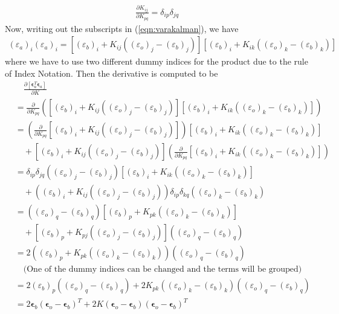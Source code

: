 \begin{align}
\frac{\partial K_{ij}}{\partial K_{pq}} = \delta_{ip}\delta_{jq}
\end{align}
Now, writing out the subscripts in (\ref{eqn:varakalman}), we have
\begin{align}
(\varepsilon_a)_i(\varepsilon_a)_i = [(\varepsilon_b)_i + K_{ij}((\varepsilon_o)_j - (\varepsilon_b)_j)][(\varepsilon_b)_i + K_{ik}((\varepsilon_o)_k - (\varepsilon_b)_k)]
\end{align}
where we have to use two different dummy indices for the product due to the rule of Index Notation. Then the derivative is computed to be
\begin{align}
&\quad \frac{\partial [\bm{\epsilon}_a^T\bm{\epsilon}_a]}{\partial K} \nonumber \\
&= \frac{\partial}{\partial K_{pq}}\left([(\varepsilon_b)_i + K_{ij}((\varepsilon_o)_j - (\varepsilon_b)_j)][(\varepsilon_b)_i + K_{ik}((\varepsilon_o)_k - (\varepsilon_b)_k)]\right) \nonumber \\
&= \left(\frac{\partial}{\partial K_{pq}}[(\varepsilon_b)_i + K_{ij}((\varepsilon_o)_j - (\varepsilon_b)_j)]\right)[(\varepsilon_b)_i + K_{ik}((\varepsilon_o)_k - (\varepsilon_b)_k)] \nonumber \\
&\quad +[(\varepsilon_b)_i + K_{ij}((\varepsilon_o)_j - (\varepsilon_b)_j)] \left(\frac{\partial}{\partial K_{pq}}[(\varepsilon_b)_i + K_{ik}((\varepsilon_o)_k - (\varepsilon_b)_k)]\right) \nonumber \\
&= \delta_{ip}\delta_{jq}((\varepsilon_o)_j - (\varepsilon_b)_j)[(\varepsilon_b)_i + K_{ik}((\varepsilon_o)_k - (\varepsilon_b)_k)] \nonumber \\
&\quad + ((\varepsilon_b)_i + K_{ij}((\varepsilon_o)_j - (\varepsilon_b)_j)) \delta_{ip}\delta_{kq} ((\varepsilon_o)_k - (\varepsilon_b)_k) \nonumber \\
&= ((\varepsilon_o)_q - (\varepsilon_b)_q)[(\varepsilon_b)_p + K_{pk}((\varepsilon_o)_k - (\varepsilon_b)_k)] \nonumber \\
&\quad + [(\varepsilon_b)_p + K_{pj}((\varepsilon_o)_j - (\varepsilon_b)_j)] ((\varepsilon_o)_q - (\varepsilon_b)_q) \nonumber \\
&= 2((\varepsilon_b)_p + K_{pk}((\varepsilon_o)_k - (\varepsilon_b)_k)) ((\varepsilon_o)_q - (\varepsilon_b)_q) \nonumber \\
&\quad \text{(One of the dummy indices can be changed and the terms will be grouped)} \nonumber \\
&= 2(\varepsilon_b)_p ((\varepsilon_o)_q - (\varepsilon_b)_q) + 2 K_{pk}((\varepsilon_o)_k - (\varepsilon_b)_k)((\varepsilon_o)_q - (\varepsilon_b)_q) \nonumber \\
&= 2 \bm{\epsilon}_b (\bm{\epsilon}_o - \bm{\epsilon}_b)^T + 2K(\bm{\epsilon}_o - \bm{\epsilon}_b)(\bm{\epsilon}_o - \bm{\epsilon}_b)^T \label{eqn:Kalmande0res}
\end{align}
